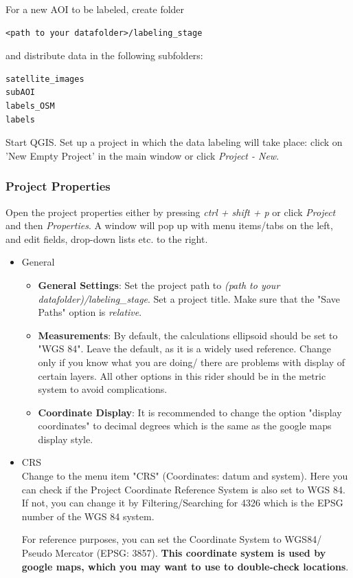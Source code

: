 \documentclass[12pt,a4paper]{scrartcl}
\begin{document}
For a new AOI to be labeled, create folder
\begin{verbatim}
<path to your datafolder>/labeling_stage
\end{verbatim}
and distribute data in the following subfolders:
\begin{verbatim}
satellite_images
subAOI
labels_OSM
labels
\end{verbatim}


Start QGIS. Set up a project in which the data labeling will take place: click on 'New Empty Project' in the main window or click \textit{Project - New}. 

\subsubsection{Project Properties}
\label{subsec:project_properties}
Open the project properties either by pressing \textit{ctrl + shift + p} or click \textit{Project} and then \textit{Properties}. A window will pop up with menu items/tabs on the left, and edit fields, drop-down lists etc. to the right. 

\begin{itemize}
	\item{General} 
	\begin{itemize}
		\item \textbf{General Settings}: Set the project path to \textit{(path to your datafolder)/labeling\_stage}. Set a project title. Make sure that the "Save Paths" option is \textit{relative}.
		\item \textbf{Measurements}: By default, the calculations ellipsoid should be set to "WGS 84". Leave the default, as it is a widely used reference. Change only if you know what you are doing/ there are problems with display of certain layers. All other options in this rider should be in the metric system to avoid complications.
		\item \textbf{Coordinate Display}: It is recommended to change the option "display coordinates" to decimal degrees which is the same as the google maps display style.
	\end{itemize}
	
	\item{CRS}\\ 
	Change to the menu item "CRS" (Coordinates: datum and system). Here you can check if the Project Coordinate Reference System is also set to WGS 84. If not, you can change it by Filtering/Searching for 4326 which is the EPSG number of the WGS 84 system.
	
	For reference purposes, you can set the Coordinate System to WGS84/ Pseudo Mercator (EPSG: 3857). \textbf{This coordinate system is used by google maps, which you may want to use to double-check locations}.
\end{itemize}
\end{document}
